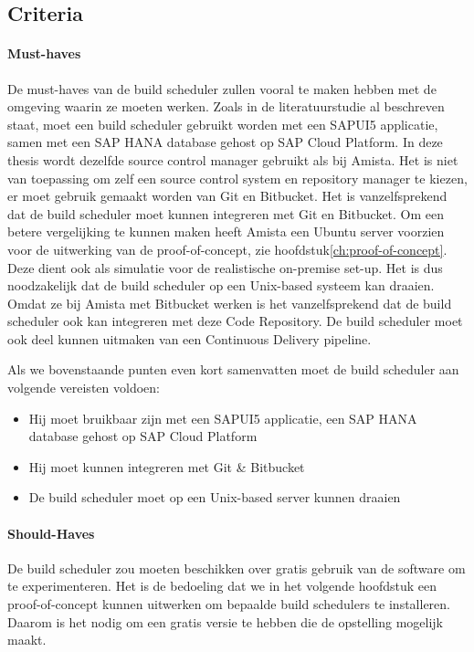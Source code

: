         \subsection{Criteria}
        \label{subsec:criteria}

            \paragraph{Must-haves}
            De must-haves van de build scheduler zullen vooral te maken hebben met de omgeving waarin ze moeten werken. Zoals in de literatuurstudie al beschreven staat, moet een build scheduler gebruikt worden met een SAPUI5 applicatie, samen met een SAP HANA database gehost op SAP Cloud Platform.
            In deze thesis wordt dezelfde source control manager gebruikt als bij Amista. Het is niet van toepassing om zelf een source control system en repository manager te kiezen, er moet gebruik gemaakt worden van Git en Bitbucket. Het is vanzelfsprekend dat de build scheduler moet kunnen integreren met Git en Bitbucket.
            Om een betere vergelijking te kunnen maken heeft Amista een Ubuntu server voorzien voor de uitwerking van de proof-of-concept, zie hoofdstuk\ref{ch:proof-of-concept}. Deze dient ook als simulatie voor de realistische on-premise set-up. Het is dus noodzakelijk dat de build scheduler op een Unix-based systeem kan draaien.
            Omdat ze bij Amista met Bitbucket werken is het vanzelfsprekend dat de build scheduler ook kan integreren met deze Code Repository.
            De build scheduler moet ook deel kunnen uitmaken van een Continuous Delivery pipeline.
            
            Als we bovenstaande punten even kort samenvatten moet de build scheduler aan volgende vereisten voldoen:
            \begin{itemize}
                \item Hij moet bruikbaar zijn met een SAPUI5 applicatie, een SAP HANA database gehost op SAP Cloud Platform
                \item Hij moet kunnen integreren met Git \& Bitbucket
                \item De build scheduler moet op een Unix-based server kunnen draaien
            \end{itemize}
            
            
            \paragraph{Should-Haves}
            De build scheduler zou moeten beschikken over gratis gebruik van de software om te experimenteren. Het is de bedoeling dat we in het volgende hoofdstuk een proof-of-concept kunnen uitwerken om bepaalde build schedulers te installeren. Daarom is het nodig om een gratis versie te hebben die de opstelling mogelijk maakt.
            
